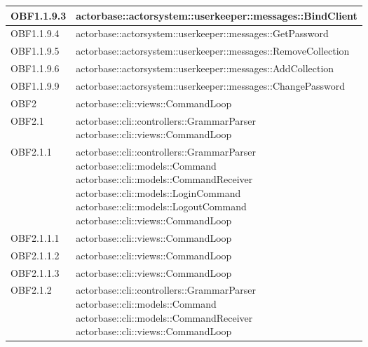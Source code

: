 \documentclass{scalatekids-article}
\begin{document}
\begin{longtable}[H]{|p{4.5cm}|p{13cm}|}
  \hline
  OBF1.1.9.3 & \multiLineCell[t]{actorbase::actorsystem::userkeeper::messages::BindClient\\}\\
  \hline
  OBF1.1.9.4 & \multiLineCell[t]{actorbase::actorsystem::userkeeper::messages::GetPassword\\}\\
  \hline
  OBF1.1.9.5 & \multiLineCell[t]{actorbase::actorsystem::userkeeper::messages::RemoveCollection\\}\\
  \hline
  OBF1.1.9.6 & \multiLineCell[t]{actorbase::actorsystem::userkeeper::messages::AddCollection\\}\\
  \hline
  OBF1.1.9.9 & \multiLineCell[t]{actorbase::actorsystem::userkeeper::messages::ChangePassword\\}\\
  \hline
  OBF2 & \multiLineCell[t]{actorbase::cli::views::CommandLoop\\}\\
  \hline
  OBF2.1 & \multiLineCell[t]{actorbase::cli::controllers::GrammarParser\\actorbase::cli::views::CommandLoop\\}\\
  \hline
  OBF2.1.1 & \multiLineCell[t]{actorbase::cli::controllers::GrammarParser\\actorbase::cli::models::Command\\actorbase::cli::models::CommandReceiver\\actorbase::cli::models::LoginCommand\\actorbase::cli::models::LogoutCommand\\actorbase::cli::views::CommandLoop\\}\\
  \hline
  OBF2.1.1.1 & \multiLineCell[t]{actorbase::cli::views::CommandLoop\\}\\
  \hline
  OBF2.1.1.2 & \multiLineCell[t]{actorbase::cli::views::CommandLoop\\}\\
  \hline
  OBF2.1.1.3 & \multiLineCell[t]{actorbase::cli::views::CommandLoop\\}\\
  \hline
  OBF2.1.2 & \multiLineCell[t]{actorbase::cli::controllers::GrammarParser\\actorbase::cli::models::Command\\actorbase::cli::models::CommandReceiver\\actorbase::cli::views::CommandLoop\\}\\

\end{longtable}
\end{document}
